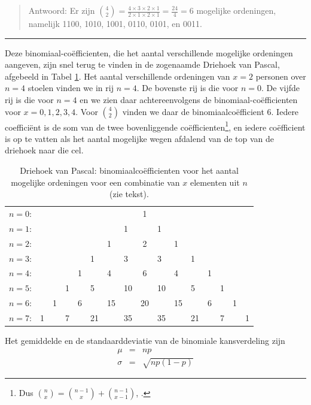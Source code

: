 \documentclass[
]{book}
\begin{document}
\begin{quote}
Antwoord: Er zijn
\({4 \choose 2} = \frac{4\times3\times2\times1}{2\times1\times2\times1} = \frac{24}{4} = 6\)
mogelijke ordeningen, namelijk 1100, 1010, 1001, 0110, 0101, en 0011.
\end{quote}

\begin{center}\rule{0.5\linewidth}{0.5pt}\end{center}

Deze binomiaal-coëfficienten, die het aantal verschillende mogelijke
ordeningen aangeven, zijn snel terug te vinden in de zogenaamde Driehoek
van Pascal, afgebeeld in Tabel \ref{tab:driehoekpascal}.
Het aantal verschillende
ordeningen van \(x=2\) personen over \(n=4\) stoelen vinden we in rij \(n=4\).
De bovenste rij is die voor \(n=0\). De vijfde rij is die voor \(n=4\) en we
zien daar achtereenvolgens de binomiaal-coëfficienten voor
\(x= 0, 1, 2, 3, 4\). Voor \({4 \choose 2}\) vinden we daar de
binomiaalcoëfficient \(6\). Iedere coefficiënt is de som van de twee
bovenliggende coëfficienten\footnote{Dus \({n \choose x} = {n-1 \choose x} + {n-1 \choose x-1}\), \citep{Weis15}.}, en iedere coëfficient is op te vatten
als het aantal mogelijke wegen afdalend van de top van de driehoek naar
die cel.

\begin{longtable}[]{@{}llllllllclllllll@{}}
\caption{\label{tab:driehoekpascal} Driehoek van Pascal: binomiaalcoëfficienten voor het aantal mogelijke ordeningen voor een combinatie van \(x\) elementen uit \(n\) (zie tekst).}\tabularnewline
\toprule\noalign{}
\endfirsthead
\endhead
\bottomrule\noalign{}
\endlastfoot
\(n= 0\): & & & & & & & & 1 & & & & & & & \\
\(n= 1\): & & & & & & & 1 & & 1 & & & & & & \\
\(n= 2\): & & & & & & 1 & & 2 & & 1 & & & & & \\
\(n= 3\): & & & & & 1 & & 3 & & 3 & & 1 & & & & \\
\(n= 4\): & & & & 1 & & 4 & & 6 & & 4 & & 1 & & & \\
\(n= 5\): & & & 1 & & 5 & & 10 & & 10 & & 5 & & 1 & & \\
\(n= 6\): & & 1 & & 6 & & 15 & & 20 & & 15 & & 6 & & 1 & \\
\(n= 7\): & 1 & & 7 & & 21 & & 35 & & 35 & & 21 & & 7 & & 1 \\
\end{longtable}

Het gemiddelde en de standaarddeviatie van de binomiale kansverdeling
zijn \[\begin{aligned}
    \mu & = & np \\
    \sigma & = & \sqrt{ np(1-p) }\end{aligned}\]
\end{document}

